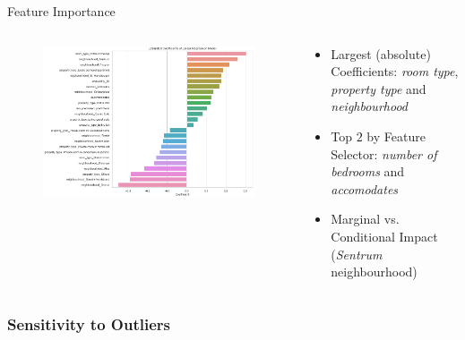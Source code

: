 \documentclass[ngerman,inputenc]{beamer}
\begin{document}
\begin{frame}{Feature Importance}
  \begin{columns}
    \begin{column}{0.6\textwidth}
      \begin{center}
        \begin{figure}
          \includegraphics[width=\columnwidth, height=0.75\textheight]{coefficient_plot.png}
          \label{fig:coefficient-plot}
        \end{figure}
      \end{center}
    \end{column}
    \begin{column}{0.4\textwidth}
      \begin{itemize}
        \item Largest (absolute) Coefficients: \emph{room type}, \emph{property type} and \emph{neighbourhood}
        \item Top $2$ by Feature Selector: \emph{number of bedrooms} and \emph{accomodates}
        \item Marginal vs. Conditional Impact (\emph{Sentrum} neighbourhood)
      \end{itemize}
    \end{column}
  \end{columns}
\end{frame}


\subsubsection{Sensitivity to Outliers}
\end{document}
